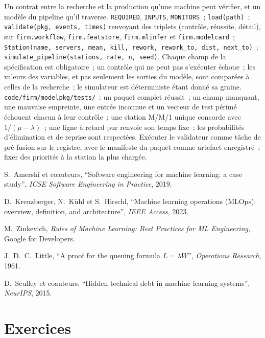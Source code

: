 \begin{build}
 Un contrat entre la recherche et la production qu'une machine peut vérifier, et un modèle du pipeline qu'il traverse.
 \texttt{REQUIRED}, \texttt{INPUTS}, \texttt{MONITORS}~; \texttt{load(path)}~;
\texttt{validate(pkg, events, times)} renvoyant des triplets (contrôle, réussite, détail), sur \texttt{firm.workflow}, \texttt{firm.featstore}, \texttt{firm.mlinfer} et
\texttt{firm.modelcard}~; \texttt{Station(name, servers, mean, kill, rework, rework\_to, dist, next\_to)}~;
\texttt{simulate\_pipeline(stations, rate, n, seed)}.
 Chaque champ de la spécification est obligatoire~; un contrôle qui ne peut pas s'exécuter échoue~; les valeurs des variables, et pas seulement les sorties du modèle,
sont comparées à celles de la recherche~; le simulateur est déterministe étant donné sa graine.
 \texttt{code/firm/modelpkg/tests/}~: un paquet complet réussit~; un champ manquant, une mauvaise empreinte,
une entrée inconnue et un vecteur de test périmé échouent chacun à leur contrôle~; une station M/M/1 unique concorde avec $1/(\mu-\lambda)$~; une ligne à retard pur
renvoie son temps fixe~; les probabilités d'élimination et de reprise sont respectées.
 Exécuter le validateur comme tâche de pré-fusion sur le registre, avec le manifeste du paquet comme artefact enregistré~;
fixer des priorités à la station la plus chargée.
\end{build}

\begin{omsources}
\item S.~Amershi et coauteurs, ``Software engineering for machine learning: a case study'', \emph{ICSE Software Engineering
in Practice}, 2019.
\item D.~Kreuzberger, N.~Kühl et S.~Hirschl, ``Machine learning operations (MLOps): overview, definition, and
architecture'', \emph{IEEE Access}, 2023.
\item M.~Zinkevich, \emph{Rules of Machine Learning: Best Practices for ML Engineering}, Google for Developers.
\item J.~D.~C.~Little, ``A proof for the queuing formula $L=\lambda W$'', \emph{Operations Research}, 1961.
\item D.~Sculley et coauteurs, ``Hidden technical debt in machine learning systems'', \emph{NeurIPS}, 2015.
\end{omsources}

\section{Exercices}

